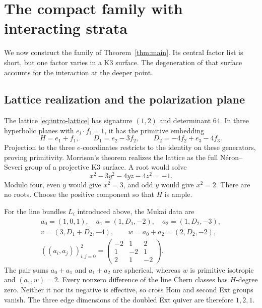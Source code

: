 \section{The compact family with interacting strata}\label{sec:compact-interaction}

We now construct the family of Theorem~\ref{thm:main}. Its
central factor list is short, but one factor varies in a K3
surface. The degeneration of that surface accounts for the
interaction at the deeper point.

\subsection{Lattice realization and the polarization plane}
The lattice \eqref{eq:intro-lattice} has signature $(1,2)$
and determinant $64$. In three hyperbolic planes with
$e_i\cdot f_i=1$, it has the primitive embedding
\begin{equation}\label{eq:primitive-embedding}
 H=e_1+f_1,\qquad D_1=e_2-3f_2,\qquad
 D_2=-4f_2+e_3-4f_3.
\end{equation}
Projection to the three $e$-coordinates restricts to the
identity on these generators, proving primitivity. Morrison's
theorem \cite[Corollary~2.9(i)]{morrison} realizes the lattice
as the full N\'eron--Severi group of a projective K3 surface.
A root would solve
\[
 x^2-3y^2-4yz-4z^2=-1.
\]
Modulo four, even $y$ would give $x^2=3$, and odd $y$ would
give $x^2=2$. There are no roots. Choose the positive component
so that $H$ is ample.

For the line bundles $L_i$ introduced above, the Mukai data are
\begin{equation}\label{eq:interacting-vectors}
 \begin{gathered}
 a_0=(1,0,1),\quad a_1=(1,D_1,-2),\quad a_2=(1,D_2,-3),\\
 v=(3,D_1+D_2,-4),\qquad w=a_0+a_2=(2,D_2,-2),\\
 ((a_i,a_j))_{i,j=0}^2=
       \begin{pmatrix}-2&1&2\\1&-2&1\\2&1&-2\end{pmatrix}.
 \end{gathered}
\end{equation}
The pair sums $a_0+a_1$ and $a_1+a_2$ are spherical,
whereas $w$ is primitive isotropic and $(a_1,w)=2$.
Every nonzero difference of the line Chern classes has
$H$-degree zero. Neither it nor its negative is effective,
so cross Hom and second Ext groups vanish. The three edge
dimensions of the doubled Ext quiver are therefore $1,2,1$.

